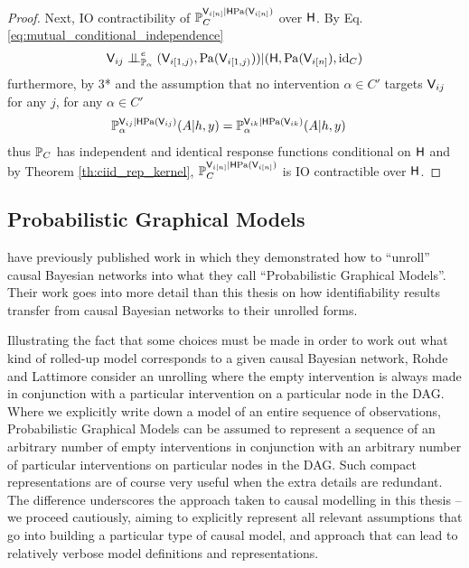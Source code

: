 \begin{proof}
Next, IO contractibility of $\mathbb{P}_C^{\mathsf{V}_{i[n]}|\mathsf{H}\mathrm{Pa}(\mathsf{V}_{i [n]})}$ over $\mathsf{H}$. By Eq. \eqref{eq:mutual_conditional_independence}
\begin{align}
    \RV{V}_{ij}\CI^e_{\prob{P}_{\alpha}} (\RV{V}_{i [1,j)},\mathrm{Pa}(\RV{V}_{i [1,j)}) )|(\RV{H},\mathrm{Pa}(\RV{V}_{i[n]}),\text{id}_C)
\end{align}
furthermore, by 3* and the assumption that no intervention $\alpha\in C'$ targets $\mathsf{V}_{ij}$ for any $j$, for any $\alpha\in C'$
\begin{align}
    \mathbb{P}_{\alpha}^{\mathsf{V}_{ij}|\mathsf{H}\mathrm{Pa}(\mathsf{V}_{ij})}(A|h,y) &= \mathbb{P}_{\alpha}^{\mathsf{V}_{ik}|\mathsf{H}\mathrm{Pa}(\mathsf{V}_{ik})}(A|h,y) 
\end{align}
thus $\mathbb{P}_C$ has independent and identical response functions conditional on $\mathsf{H}$ and by Theorem \ref{th:ciid_rep_kernel}, $\mathbb{P}_C^{\mathsf{V}_{i[n]}|\mathsf{H}\mathrm{Pa}(\mathsf{V}_{i [n]})}$ is IO contractible over $\mathsf{H}$.
\end{proof}

\subsection[Probabilistic Graphical Models]{Probabilistic Graphical Models}

\citet{lattimore_replacing_2019,lattimore_causal_2019} have previously published work in which they demonstrated how to ``unroll'' causal Bayesian networks into what they call ``Probabilistic Graphical Models''. Their work goes into more detail than this thesis on how identifiability results transfer from causal Bayesian networks to their unrolled forms.

Illustrating the fact that some choices must be made in order to work out what kind of rolled-up model corresponds to a given causal Bayesian network, Rohde and Lattimore consider an unrolling where the empty intervention is always made in conjunction with a particular intervention on a particular node in the DAG. Where we explicitly write down a model of an entire sequence of observations, Probabilistic Graphical Models can be assumed to represent a sequence of an arbitrary number of empty interventions in conjunction with an arbitrary number of particular interventions on particular nodes in the DAG. Such compact representations are of course very useful when the extra details are redundant. The difference underscores the approach taken to causal modelling in this thesis -- we proceed cautiously, aiming to explicitly represent all relevant assumptions that go into building a particular type of causal model, and approach that can lead to relatively verbose model definitions and representations.

